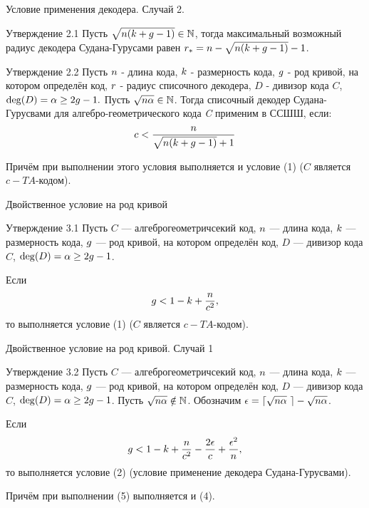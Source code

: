 \documentclass{beamer}
\begin{document}
\begin {frame} {Условие применения декодера. Случай 2.}
\begin {block} {Утверждение 2.1}
Пусть $\sqrt { {\sl n} (k+g-1) } \in {\mathbb N}$, тогда максимальный возможный радиус декодера Судана-Гурусами равен ${\sl r_*}  =  {\sl n} - \sqrt { {\sl n} (k+g-1) } - 1$.
\end {block}

\begin {block} {Утверждение 2.2}
Пусть ${\sl n}$  - длина кода,  ${\sl k}$  - размерность кода, ${\sl g}$ - род кривой, на котором определён код, ${\sl r}$ - радиус списочного декодера, $D$ - дивизор кода $C$, ${\rm deg}(D) = \alpha \ge 2g - 1.$  Пусть $\sqrt { {\sl n}\alpha } \in {\mathbb N}$.
Тогда списочный декодер Судана-Гурусвами для алгебро-геометрического кода {\sl C} применим в ССШШ, если:
\begin{equation}
 {\sl c} < \frac {\sl n}{\sqrt {{\sl n} (k+g-1)} + 1}
\end {equation}

Причём при выполнении этого условия выполняется и условие (1) ($C$ является $c-TA$-кодом).
\end {block}
\end {frame}

\begin {frame} {Двойственное условие на род кривой}
\begin {block} {Утверждение 3.1}
Пусть  $C$ --- алгеброгеометричсекий код, ${\sl n}$  --- длина кода,  ${\sl k}$  --- размерность кода, ${\sl g}$ --- род кривой, на котором определён код, $D$ --- дивизор кода $C$, ${\rm deg}(D) = \alpha \ge 2g - 1$.

Если
\begin {equation}
 {\sl g} < 1 - k + \frac {\sl n}{\sl c^2},
\end {equation}
то выполняется условие (1) ($C$ является $c-TA$-кодом).
\end {block}
\end {frame}

\begin {frame} {Двойственное условие на род кривой. Случай 1}
\begin {block} {Утверждение 3.2}
Пусть $C$ --- алгеброгеометричсекий код, ${\sl n}$  --- длина кода,  ${\sl k}$  --- размерность кода, ${\sl g}$ --- род кривой, на котором определён код, $D$ --- дивизор кода $C$, ${\rm deg}(D) = \alpha \ge 2g - 1$.  Пусть $\sqrt { {\sl n}\alpha } \notin {\mathbb N}$. Обозначим $ \epsilon =\lceil  \sqrt {{\sl n} \alpha} \ \rceil - \sqrt {{\sl n} \alpha} $.

Если
\begin {equation}
 {\sl g} < 1 - k + \frac {\sl n}{\sl c^2} - \frac {2\epsilon}{\sl c} + \frac {\epsilon ^2}{\sl n},
\end {equation}
то выполняется условие (2) (условие применение декодера Судана-Гурусвами).

Причём при выполнении (5) выполняется и (4).
\end {block}
\end {frame}
\end{document}
